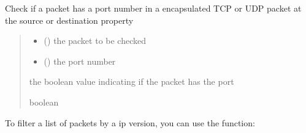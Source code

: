 \documentclass[letterpaper,10pt,english,openany,oneside]{sphinxmanual}
\begin{document}
\begin{fulllineitems}
\label{\detokenize{index:pktsniffer.has_port}}
\pysigstartsignatures
\pysiglinewithargsret
{}
{\sphinxparamcomma {}}
{}
\pysigstopsignatures
\sphinxAtStartPar
Check if a packet has a port number in a encapsulated TCP
or UDP packet at the source or destination property
\begin{quote}\begin{description}
\begin{itemize}
\item {} 
\sphinxAtStartPar
{} () \textendash{} the packet to be checked

\item {} 
\sphinxAtStartPar
{} () \textendash{} the port number

\end{itemize}

\sphinxAtStartPar
the boolean value indicating if the packet has the port

\sphinxAtStartPar
boolean

\end{description}\end{quote}

\end{fulllineitems}


\sphinxAtStartPar
To filter a list of packets by a ip version, you can
use the  function:
\end{document}
